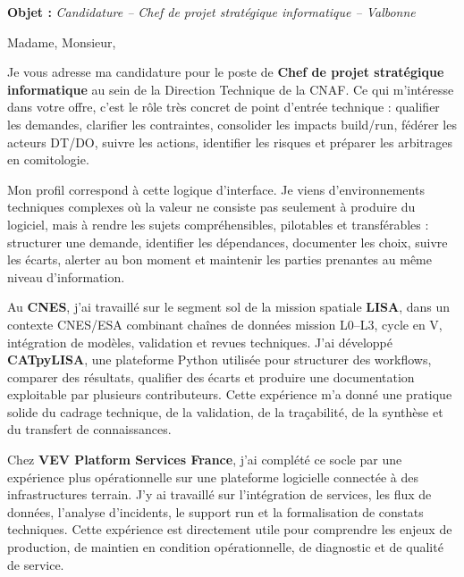 \documentclass[11pt,a4paper]{altacv}
\begin{document}
\makecvheader
\vspace{-0.65cm}

\vspace{-0.45cm}

{\color{accent}\textbf{Objet :}} \textit{Candidature -- Chef de projet stratégique informatique -- Valbonne}

{\color{body}

Madame, Monsieur,

Je vous adresse ma candidature pour le poste de \textbf{Chef de projet stratégique informatique} au sein de la Direction Technique de la CNAF. Ce qui m'intéresse dans votre offre, c'est le rôle très concret de point d'entrée technique : qualifier les demandes, clarifier les contraintes, consolider les impacts build/run, fédérer les acteurs DT/DO, suivre les actions, identifier les risques et préparer les arbitrages en comitologie.

Mon profil correspond à cette logique d'interface. Je viens d'environnements techniques complexes où la valeur ne consiste pas seulement à produire du logiciel, mais à rendre les sujets compréhensibles, pilotables et transférables : structurer une demande, identifier les dépendances, documenter les choix, suivre les écarts, alerter au bon moment et maintenir les parties prenantes au même niveau d'information.

Au \textbf{CNES}, j'ai travaillé sur le segment sol de la mission spatiale \textbf{LISA}, dans un contexte CNES/ESA combinant chaînes de données mission L0--L3, cycle en V, intégration de modèles, validation et revues techniques. J'ai développé \textbf{CATpyLISA}, une plateforme Python utilisée pour structurer des workflows, comparer des résultats, qualifier des écarts et produire une documentation exploitable par plusieurs contributeurs. Cette expérience m'a donné une pratique solide du cadrage technique, de la validation, de la traçabilité, de la synthèse et du transfert de connaissances.

Chez \textbf{VEV Platform Services France}, j'ai complété ce socle par une expérience plus opérationnelle sur une plateforme logicielle connectée à des infrastructures terrain. J'y ai travaillé sur l'intégration de services, les flux de données, l'analyse d'incidents, le support run et la formalisation de constats techniques. Cette expérience est directement utile pour comprendre les enjeux de production, de maintien en condition opérationnelle, de diagnostic et de qualité de service.

}
\end{document}
